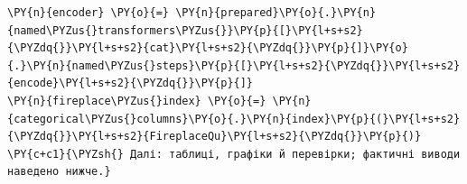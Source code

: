 \begin{Verbatim}[commandchars=\\\{\}]
\PY{n}{encoder} \PY{o}{=} \PY{n}{prepared}\PY{o}{.}\PY{n}{named\PYZus{}transformers\PYZus{}}\PY{p}{[}\PY{l+s+s2}{\PYZdq{}}\PY{l+s+s2}{cat}\PY{l+s+s2}{\PYZdq{}}\PY{p}{]}\PY{o}{.}\PY{n}{named\PYZus{}steps}\PY{p}{[}\PY{l+s+s2}{\PYZdq{}}\PY{l+s+s2}{encode}\PY{l+s+s2}{\PYZdq{}}\PY{p}{]}
\PY{n}{fireplace\PYZus{}index} \PY{o}{=} \PY{n}{categorical\PYZus{}columns}\PY{o}{.}\PY{n}{index}\PY{p}{(}\PY{l+s+s2}{\PYZdq{}}\PY{l+s+s2}{FireplaceQu}\PY{l+s+s2}{\PYZdq{}}\PY{p}{)}
\PY{c+c1}{\PYZsh{} Далі: таблиці, графіки й перевірки; фактичні виводи наведено нижче.}
\end{Verbatim}
